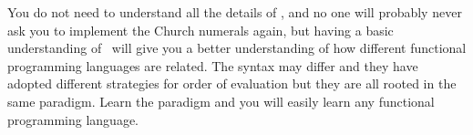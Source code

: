 \documentclass[a4paper,11pt]{article}
\begin{document}
You do not need to understand all the details of \lamc , and no one
will probably never ask you to implement the Church numerals again,
but having a basic understanding of \lamc\ will give you a better
understanding of how different functional programming languages are
related. The syntax may differ and they have adopted different
strategies for order of evaluation but they are all rooted in the same
paradigm. Learn the paradigm and you will easily learn any functional
programming language.
\end{document}
